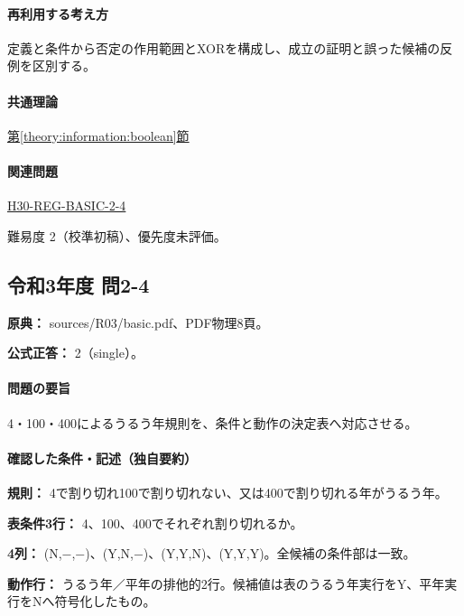 \paragraph{再利用する考え方} 定義と条件から否定の作用範囲とXORを構成し、成立の証明と誤った候補の反例を区別する。

\paragraph{共通理論} \hyperref[theory:information:boolean]{第\ref*{theory:information:boolean}節}

\paragraph{関連問題} \hyperref[q:h30-reg-basic-2-4]{H30-REG-BASIC-2-4}

\par 難易度 2（校準初稿）、優先度未評価。

\subsection{令和3年度 問2-4}
\label{q:r03-reg-basic-2-4}

\noindent\textbf{原典：} sources/R03/basic.pdf、PDF物理8頁。

\textbf{公式正答：} 2（single）。

\paragraph{問題の要旨} 4・100・400によるうるう年規則を、条件と動作の決定表へ対応させる。

\paragraph{確認した条件・記述（独自要約）}\mbox{}\par

\noindent\textbf{規則：} 4で割り切れ100で割り切れない、又は400で割り切れる年がうるう年。\par

\noindent\textbf{表条件3行：} 4、100、400でそれぞれ割り切れるか。\par

\noindent\textbf{4列：} (N,−,−)、(Y,N,−)、(Y,Y,N)、(Y,Y,Y)。全候補の条件部は一致。\par

\noindent\textbf{動作行：} うるう年／平年の排他的2行。候補値は表のうるう年実行をY、平年実行をNへ符号化したもの。\par

